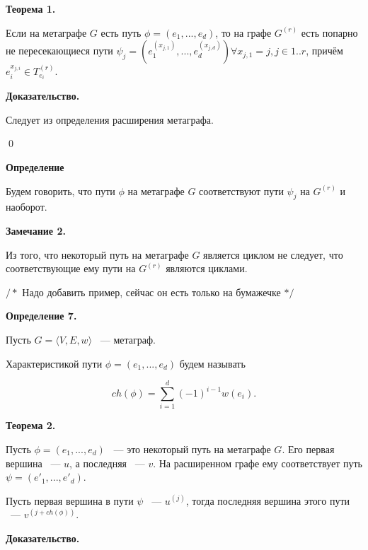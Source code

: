 \documentclass[14pt]{mmcs-article}
\begin{document}
\textbf{Теорема 1.}

Если на метаграфе $G$ есть путь $\phi = (e_1, ..., e_d)$, то на графе $G^{(r)}$ есть попарно не пересекающиеся пути $\psi_j = (e^{(x_{j, 1})}_1, ..., e^{(x_{j, d})}_d)\forall x_{j, 1} = j, j \in 1..r$, причём $e^{x_{j, i}}_i \in T^{(r)}_{e_i}$.

\textbf{Доказательство.}

Следует из определения расширения метаграфа.

\qed

\textbf{Определение}

Будем говорить, что пути $\phi$ на метаграфе $G$ соответствуют пути $\psi_j$ на $G^{(r)}$ и наоборот.

\textbf{Замечание 2.}

Из того, что некоторый путь на метаграфе $G$ является циклом не следует, что соответствующие ему пути на $G^{(r)}$ являются циклами.

$/*$ Надо добавить пример, сейчас он есть только на бумажечке $*/$

\textbf{Определение 7.}

Пусть $G = \langle V, E, w \rangle$ ~--- метаграф.

Характеристикой пути $\phi = (e_1, ..., e_d)$ будем называть

\[
    ch(\phi) = \sum_{i = 1}^d(-1)^{i - 1}w(e_i).
\]

\textbf{Теорема 2.}

Пусть  $\phi = (e_1, ..., e_d)$ ~--- это некоторый путь на метаграфе $G$. Его первая вершина ~--- $u$, а последняя ~--- $v$. На расширенном графе ему соответствует путь $\psi = (e'_1, ..., e'_d)$.

Пусть первая вершина в пути $\psi$ ~--- $u^{(j)}$, тогда последняя вершина этого пути ~--- $v^{(j + ch(\phi))}$.

\textbf{Доказательство.}




\end{document}
